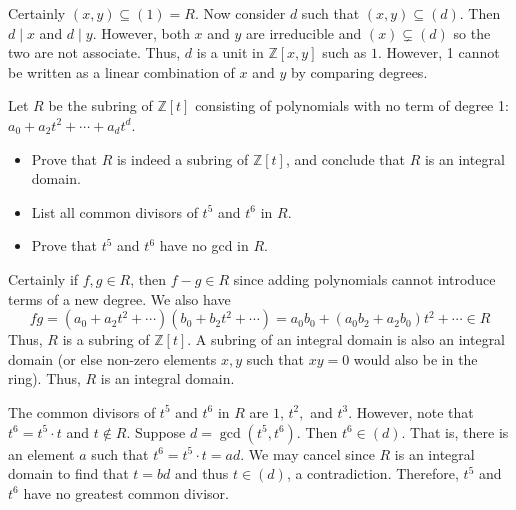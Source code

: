 \documentclass[../../master.tex]{subfiles}
\begin{document}
    \begin{solution}
        Certainly $(x, y) \subseteq (1) = R$. Now consider $d$ such
        that $(x, y) \subseteq (d)$. Then $d \mid x$ and $d \mid y$. However,
        both $x$ and $y$ are irreducible and $(x) \subsetneq (d)$ so the two are
        not associate. Thus, $d$ is a unit in $\mathbb{Z}[x, y]$ such as $1$.
        However, 1 cannot be written as a linear combination of $x$ and $y$ by
        comparing degrees.
    \end{solution}

    \begin{problem}
        Let $R$ be the subring of $\mathbb{Z}[t]$ consisting of polynomials with
        no term of degree 1: $a_0 + a_2 t^2 + \cdots + a_d t^{d}$.
        \begin{itemize}
            \item Prove that $R$ is indeed a subring of $\mathbb{Z}[t]$, and
                conclude that $R$ is an integral domain.
            \item List all common divisors of $t^{5}$ and $t^{6}$ in $R$.
            \item Prove that $t^{5}$ and $t^{6}$ have no gcd in $R$.
        \end{itemize}
    \end{problem}

    \begin{solution}
        Certainly if $f, g \in R$, then $f - g \in R$ since adding polynomials
        cannot introduce terms of a new degree. We also have
        \[
            fg = (a_0 + a_2t^2 + \cdots)(b_0 + b_2t^2 + \cdots) = a_0b_0 +
            (a_0b_2 + a_2b_0) t^2 + \cdots \in R
        \] 
        Thus, $R$ is a subring of $\mathbb{Z}[t]$. A subring of an integral
        domain is also an integral domain (or else non-zero elements $x, y$ such
        that $xy = 0$ would also be in the ring). Thus, $R$ is an integral
        domain.

        The common divisors of $t^{5}$ and $t^{6}$ in $R$ are $1, \, t^2,$ and
        $t^3$. However, note that $t^{6} = t^{5} \cdot t$ and $t \notin R$.
        Suppose $d = \gcd(t^{5}, t^{6})$. Then $t^{6} \in (d)$. That is, there
        is an element $a$ such that $t^{6} = t^{5} \cdot t = ad$. We may cancel
        since $R$ is an integral domain to find that $t = bd$ and thus $t \in
        (d)$, a contradiction. Therefore, $t^{5}$ and $t^{6}$ have no greatest
        common divisor.
    \end{solution}
\end{document}
